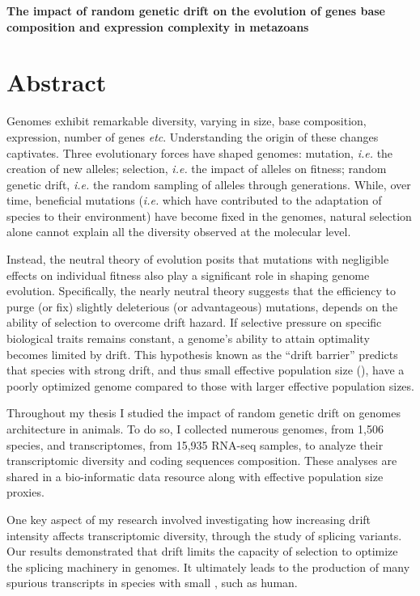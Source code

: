 \thispagestyle{empty}
\vspace*{-70pt}

\begin{center}
	\Large
	\textbf{The impact of random genetic drift on the evolution of genes base composition and expression complexity in metazoans}
\end{center}

\section*{\large{Abstract}}
Genomes exhibit remarkable diversity, varying in size, base composition, expression, number of genes \textit{etc}. Understanding the origin of these changes captivates. Three evolutionary forces have shaped genomes: mutation, \textit{i.e.} the creation of new alleles; selection, \textit{i.e.} the impact of alleles on fitness; random genetic drift, \textit{i.e.} the random sampling of alleles through generations. While, over time, beneficial mutations (\textit{i.e.} which have contributed to the adaptation of species to their environment) have become fixed in the genomes, natural selection alone cannot explain all the diversity observed at the molecular level.

Instead, the neutral theory of evolution posits that mutations with negligible effects on individual fitness also play a significant role in shaping genome evolution. Specifically, the nearly neutral theory suggests that the efficiency to purge (or fix) slightly deleterious (or advantageous) mutations, depends on the ability of selection to overcome drift hazard. If selective pressure on specific biological traits remains constant, a genome's ability to attain optimality becomes limited by drift. This hypothesis known as the “drift barrier” predicts that species with strong drift, and thus small effective population size (\Ne), have a poorly optimized genome compared to those with larger effective population sizes.

Throughout my thesis I studied the impact of random genetic drift on genomes architecture in animals. To do so, I collected numerous genomes, from 1,506 species, and transcriptomes, from 15,935 RNA-seq samples, to analyze their transcriptomic diversity and coding sequences composition. These analyses are shared in a bio-informatic data resource along with effective population size proxies. 

One key aspect of my research involved investigating how increasing drift intensity affects transcriptomic diversity, through the study of splicing variants. Our results demonstrated that drift limits the capacity of selection to optimize the splicing machinery in genomes. It ultimately leads to the production of many spurious transcripts in species with small \Ne, such as human.

